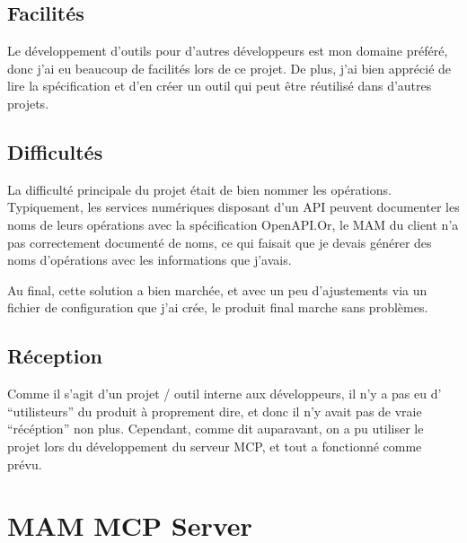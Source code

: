 \subsection*{Facilités}

\begin{flushleft}
  Le développement d'outils pour d'autres développeurs est mon domaine
  préféré, donc j'ai eu beaucoup de facilités lors de ce projet.
  De plus, j'ai bien apprécié de lire la spécification et d'en créer
  un outil qui peut être réutilisé dans d'autres projets.
\end{flushleft}

\subsection*{Difficultés}

\begin{flushleft}
  La difficulté principale du projet était de bien nommer les opérations.
  Typiquement, les services numériques disposant d'un API peuvent documenter
  les noms de leurs opérations avec la spécification OpenAPI.\@ Or, le MAM
  du client n'a pas correctement documenté de noms, ce qui faisait que je devais
  générer des noms d'opérations avec les informations que j'avais.
\end{flushleft}

\begin{flushleft}
  Au final, cette solution a bien marchée, et avec un peu d'ajustements via
  un fichier de configuration que j'ai crée, le produit final marche sans
  problèmes.
\end{flushleft}

\subsection*{Réception}

\begin{flushleft}
  Comme il s'agit d'un projet / outil interne aux développeurs, il n'y
  a pas eu d' ``utilisteurs'' du produit à proprement dire, et donc il
  n'y avait pas de vraie ``récéption'' non plus.
  Cependant, comme dit auparavant, on a pu utiliser le projet lors du
  développement du serveur MCP, et tout a fonctionné comme prévu.
\end{flushleft}

\newpage

\section{MAM MCP Server}

